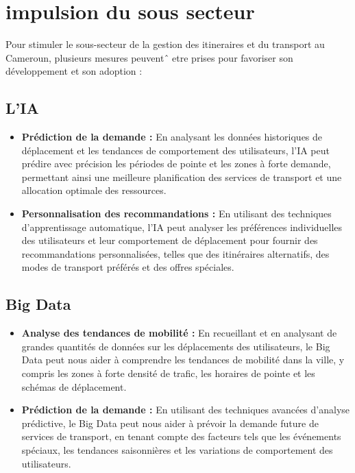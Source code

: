 

\section{impulsion du sous secteur}


Pour stimuler le sous-secteur de la gestion des itineraires et du transport au
 Cameroun, plusieurs mesures peuventˆ etre prises pour favoriser son développement
 et son adoption :

 \subsection{L'IA}

\begin{itemize}
    \item \textbf{Prédiction de la demande :} En analysant les données historiques de déplacement et les tendances de comportement des utilisateurs, l'IA peut prédire avec précision les périodes de pointe et les zones à forte demande, permettant ainsi une meilleure planification des services de transport et une allocation optimale des ressources.
    
    \item \textbf{Personnalisation des recommandations :} En utilisant des techniques d'apprentissage automatique, l'IA peut analyser les préférences individuelles des utilisateurs et leur comportement de déplacement pour fournir des recommandations personnalisées, telles que des itinéraires alternatifs, des modes de transport préférés et des offres spéciales.
\end{itemize}
\subsection{Big Data}

\begin{itemize}
    \item \textbf{Analyse des tendances de mobilité :} En recueillant et en analysant de grandes quantités de données sur les déplacements des utilisateurs, le Big Data peut nous aider à comprendre les tendances de mobilité dans la ville, y compris les zones à forte densité de trafic, les horaires de pointe et les schémas de déplacement.
    
    \item \textbf{Prédiction de la demande :} En utilisant des techniques avancées d'analyse prédictive, le Big Data peut nous aider à prévoir la demande future de services de transport, en tenant compte des facteurs tels que les événements spéciaux, les tendances saisonnières et les variations de comportement des utilisateurs.
\end{itemize}

